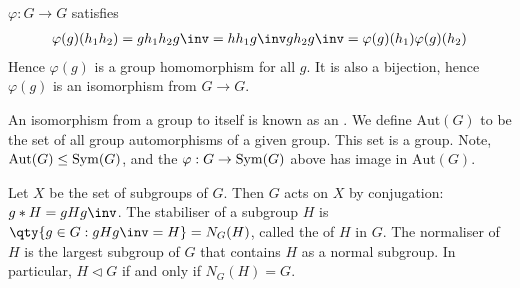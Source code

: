 \begin{remark}
	$\varphi : G \to G$ satisfies
	\begin{align*}
		\varphi(g)(h_1 h_2) = g h_1 h_2 g\inv = h h_1 g\inv g h_2 g\inv = \varphi(g)(h_1) \varphi(g)(h_2)
	\end{align*}
	Hence $\varphi(g)$ is a group homomorphism for all $g$.
	It is also a bijection, hence $\varphi(g)$ is an isomorphism from $G \to G$.
\end{remark}

\begin{definition}[Automorphism]
	An isomorphism from a group to itself is known as an .
	We define $\mathrm{Aut}(G)$ to be the set of all group automorphisms of a given group.
	This set is a group.
	Note, $\mathrm{Aut}(G) \leq \operatorname{Sym}(G)$, and the $\varphi : G \to \operatorname{Sym}(G)$ above has image in $\mathrm{Aut}(G)$.
\end{definition}

\begin{example}
	Let $X$ be the set of subgroups of $G$.
	Then $G$ acts on $X$ by conjugation: $g \ast H = g H g\inv$.
	The stabiliser of a subgroup $H$ is $\qty{ g \in G : gHg\inv = H } = N_G(H)$, called the  of $H$ in $G$.
	The normaliser of $H$ is the largest subgroup of $G$ that contains $H$ as a normal subgroup.
	In particular, $H \triangleleft G$ if and only if $N_G(H) = G$.
\end{example}
